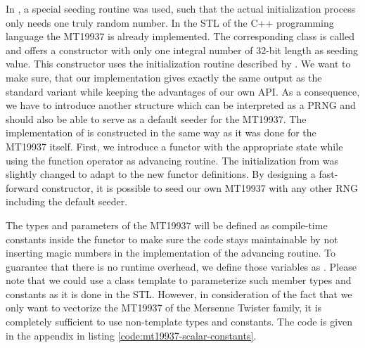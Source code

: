 \documentclass{stdlocal}
\begin{document}
    In \textcite{kneusel2018}, a special seeding routine was used, such that the actual initialization process only needs one truly random number.
    In the STL of the C++ programming language the MT19937 is already implemented.
    The corresponding class is called  and offers a constructor with only one integral number of 32-bit length as seeding value.
    This constructor uses the initialization routine described by \textcite{kneusel2018}.
    We want to make sure, that our implementation gives exactly the same output as the standard variant while keeping the advantages of our own API.
    As a consequence, we have to introduce another structure  which can be interpreted as a PRNG and should also be able to serve as a default seeder for the MT19937.
    The implementation of  is constructed in the same way as it was done for the MT19937 itself.
    First, we introduce a functor with the appropriate state while using the function operator as advancing routine.
    The initialization from \textcite{kneusel2018} was slightly changed to adapt to the new functor definitions.
    By designing a fast-forward constructor, it is possible to seed our own MT19937 with any other RNG including the default seeder.

    The types and parameters of the MT19937 will be defined as compile-time constants inside the functor to make sure the code stays maintainable by not inserting magic numbers in the implementation of the advancing routine.
    To guarantee that there is no runtime overhead, we define those variables as .
    Please note that we could use a class template to parameterize such member types and constants as it is done in the STL.
    However, in consideration of the fact that we only want to vectorize the MT19937 of the Mersenne Twister family, it is completely sufficient to use non-template types and constants.
    The code is given in the appendix in listing \ref{code:mt19937-scalar-constants}.
\end{document}

